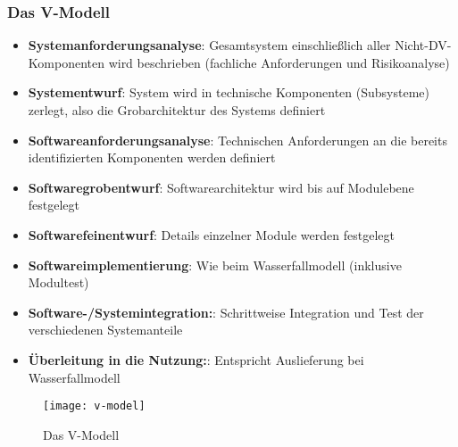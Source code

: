 	\subsubsection{Das V-Modell}
	\begin{itemize}
		\item \textbf{Systemanforderungsanalyse}: Gesamtsystem einschließlich aller Nicht-DV-Komponenten wird beschrieben (fachliche Anforderungen und Risikoanalyse)
		\item \textbf{Systementwurf}: System wird in technische Komponenten (Subsysteme) zerlegt, also die Grobarchitektur des Systems definiert
		\item \textbf{Softwareanforderungsanalyse}: Technischen Anforderungen an die bereits identifizierten Komponenten werden definiert
		\item \textbf{Softwaregrobentwurf}: Softwarearchitektur wird bis auf Modulebene festgelegt
		\item \textbf{Softwarefeinentwurf}: Details einzelner Module werden festgelegt
		\item \textbf{Softwareimplementierung}: Wie beim Wasserfallmodell (inklusive Modultest) 
		\item \textbf{Software-/Systemintegration:}: Schrittweise Integration und Test der verschiedenen Systemanteile
		\item \textbf{Überleitung in die Nutzung:}: Entspricht Auslieferung bei Wasserfallmodell
	\end{itemize}
	\begin{figure}[h]
		\centering
		\caption{Das V-Modell}
		\texttt{[image: v-model]}
	\end{figure}
